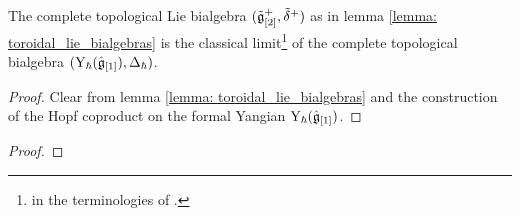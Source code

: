             \begin{theorem} \label{theorem: toroidal_lie_algebras_as_classical_limits_of_affine_yangians}
                The complete topological Lie bialgebra $(\tilde{\mathfrak{g}}_{[2]}^+, \tilde{\delta}^+)$ as in lemma \ref{lemma: toroidal_lie_bialgebras} is the classical limit\footnote{ in the terminologies of \cite{etingof_kazhdan_quantisation_1}.} of the complete topological bialgebra $(\mathrm{Y}_{\hbar}(\hat{\mathfrak{g}}_{[1]}), \Delta_{\hbar})$.
            \end{theorem}
                \begin{proof}
                    Clear from lemma \ref{lemma: toroidal_lie_bialgebras} and the construction of the Hopf coproduct on the formal Yangian $\mathrm{Y}_{\hbar}(\hat{\mathfrak{g}}_{[1]})$. 
                \end{proof}
                
            \begin{definition} \label{def: parametrised_pseudo_quantisations}
                
            \end{definition}
            \begin{theorem} \label{theorem: parametrised_pseudo_classical_limits_of_affine_yangians}
                
            \end{theorem}
                \begin{proof}
                    
                \end{proof}

    \begin{appendices}
        
    
        
    \end{appendices}
            
    \printbibliography

